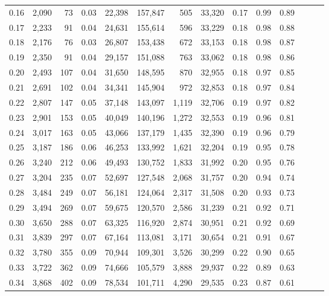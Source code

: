 \begin{tabular}{rrrrrrrrrrrrrr}
0.16 &  2,090 &   73 &  0.03 &   22,398 &  157,847 &     505 &  33,320 &  0.17 &  0.99 &      0.89 \\
0.17 &  2,233 &   91 &  0.04 &   24,631 &  155,614 &     596 &  33,229 &  0.18 &  0.98 &      0.88 \\
0.18 &  2,176 &   76 &  0.03 &   26,807 &  153,438 &     672 &  33,153 &  0.18 &  0.98 &      0.87 \\
0.19 &  2,350 &   91 &  0.04 &   29,157 &  151,088 &     763 &  33,062 &  0.18 &  0.98 &      0.86 \\
0.20 &  2,493 &  107 &  0.04 &   31,650 &  148,595 &     870 &  32,955 &  0.18 &  0.97 &      0.85 \\
0.21 &  2,691 &  102 &  0.04 &   34,341 &  145,904 &     972 &  32,853 &  0.18 &  0.97 &      0.84 \\
0.22 &  2,807 &  147 &  0.05 &   37,148 &  143,097 &   1,119 &  32,706 &  0.19 &  0.97 &      0.82 \\
0.23 &  2,901 &  153 &  0.05 &   40,049 &  140,196 &   1,272 &  32,553 &  0.19 &  0.96 &      0.81 \\
0.24 &  3,017 &  163 &  0.05 &   43,066 &  137,179 &   1,435 &  32,390 &  0.19 &  0.96 &      0.79 \\
0.25 &  3,187 &  186 &  0.06 &   46,253 &  133,992 &   1,621 &  32,204 &  0.19 &  0.95 &      0.78 \\
0.26 &  3,240 &  212 &  0.06 &   49,493 &  130,752 &   1,833 &  31,992 &  0.20 &  0.95 &      0.76 \\
0.27 &  3,204 &  235 &  0.07 &   52,697 &  127,548 &   2,068 &  31,757 &  0.20 &  0.94 &      0.74 \\
0.28 &  3,484 &  249 &  0.07 &   56,181 &  124,064 &   2,317 &  31,508 &  0.20 &  0.93 &      0.73 \\
0.29 &  3,494 &  269 &  0.07 &   59,675 &  120,570 &   2,586 &  31,239 &  0.21 &  0.92 &      0.71 \\
0.30 &  3,650 &  288 &  0.07 &   63,325 &  116,920 &   2,874 &  30,951 &  0.21 &  0.92 &      0.69 \\
0.31 &  3,839 &  297 &  0.07 &   67,164 &  113,081 &   3,171 &  30,654 &  0.21 &  0.91 &      0.67 \\
0.32 &  3,780 &  355 &  0.09 &   70,944 &  109,301 &   3,526 &  30,299 &  0.22 &  0.90 &      0.65 \\
0.33 &  3,722 &  362 &  0.09 &   74,666 &  105,579 &   3,888 &  29,937 &  0.22 &  0.89 &      0.63 \\
0.34 &  3,868 &  402 &  0.09 &   78,534 &  101,711 &   4,290 &  29,535 &  0.23 &  0.87 &      0.61 \\

\end{tabular}
